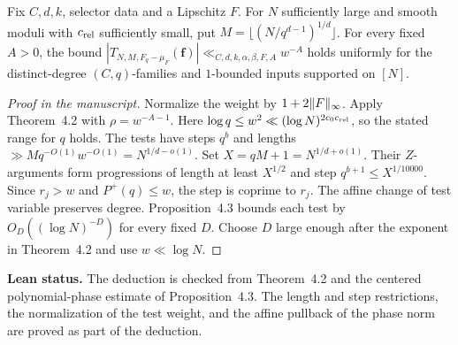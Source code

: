 \begin{lemma}\label{l:unweighted-selector-relative-range}
\leanok
{}
Fix $C,d,k$, selector data and a Lipschitz $F$. For $N$ sufficiently
large and smooth moduli with $c_{\rm rel}$ sufficiently small, put
$M=\lfloor(N/q^{d-1})^{1/d}\rfloor$. For every fixed $A>0$,
the bound
$|T_{N,M,F_q-\mu_F}(\mathbf f)|\ll_{C,d,k,\alpha,\beta,F,A}w^{-A}$
holds uniformly for the distinct-degree $(C,q)$-families
and $1$-bounded inputs supported on $[N]$.
\end{lemma}
\begin{proof}[Proof in the manuscript]
\leanok
Normalize the weight by $1+2\lVert F\rVert_\infty$.
Apply Theorem~4.2 with $\rho=w^{-A-1}$.
Here $\log q\le w^2\ll(\log N)^{2c_0 c_{\rm rel}}$,
so the stated range for $q$ holds. The tests have steps $q^b$
and lengths $\gg Mq^{-O(1)}w^{-O(1)}=N^{1/d-o(1)}$.
Set $X=qM+1=N^{1/d+o(1)}$. Their $Z$-arguments form
progressions of length at least $X^{1/2}$ and step
$q^{b+1}\le X^{1/10000}$. Since $r_j>w$ and $P^+(q)\le w$,
the step is coprime to $r_j$. The affine change of test variable
preserves degree. Proposition~4.3 bounds each test by
$O_D((\log N)^{-D})$ for every fixed $D$.
Choose $D$ large enough after the exponent in Theorem~4.2 and
use $w\ll\log N$.
\end{proof}
\noindent\textbf{Lean status.} The deduction is checked from
Theorem~4.2 and the centered polynomial-phase estimate of
Proposition~4.3. The length and step restrictions, the normalization
of the test weight, and the affine pullback of the phase norm
are proved as part of the deduction.


